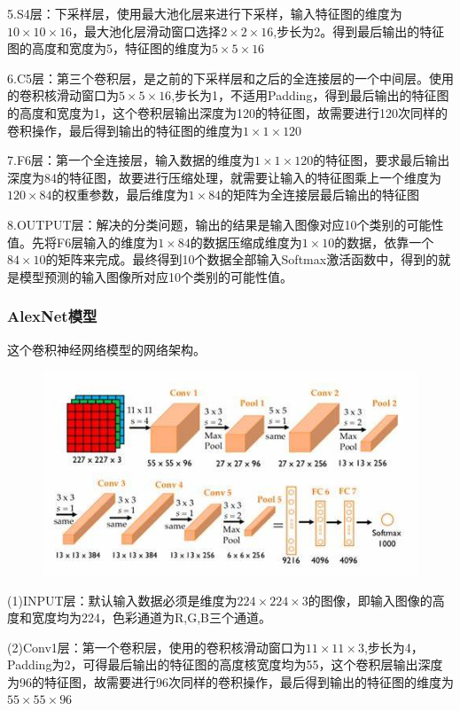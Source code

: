 \documentclass[openbib]{article}
\begin{document}
5.S4层：下采样层，使用最大池化层来进行下采样，输入特征图的维度为$10\times10\times16$，最大池化层滑动窗口选择$2\times2\times16$,步长为2。得到最后输出的特征图的高度和宽度为5，特征图的维度为$5\times5\times16$

6.C5层：第三个卷积层，是之前的下采样层和之后的全连接层的一个中间层。使用的卷积核滑动窗口为$5\times5\times16$,步长为1，不适用Padding，得到最后输出的特征图的高度和宽度为1，这个卷积层输出深度为120的特征图，故需要进行120次同样的卷积操作，最后得到输出的特征图的维度为$1\times1\times120$

7.F6层：第一个全连接层，输入数据的维度为$1\times1\times120$的特征图，要求最后输出深度为84的特征图，故要进行压缩处理，就需要让输入的特征图乘上一个维度为$120\times84$的权重参数，最后维度为$1\times84$的矩阵为全连接层最后输出的特征图

8.OUTPUT层：解决的分类问题，输出的结果是输入图像对应10个类别的可能性值。先将F6层输入的维度为$1\times84$的数据压缩成维度为$1\times10$的数据，依靠一个$84\times10$的矩阵来完成。最终得到10个数据全部输入Softmax激活函数中，得到的就是模型预测的输入图像所对应10个类别的可能性值。
\subsubsection{AlexNet模型}
这个卷积神经网络模型的网络架构。
\begin{figure}[htbp]
	\centering
	\includegraphics[scale=0.5]{AlexNet}
\end{figure}

(1)INPUT层：默认输入数据必须是维度为$224\times224\times3$的图像，即输入图像的高度和宽度均为224，色彩通道为R,G,B三个通道。

(2)Conv1层：第一个卷积层，使用的卷积核滑动窗口为$11\times11\times3$,步长为4，Padding为2，可得最后输出的特征图的高度核宽度均为55，这个卷积层输出深度为96的特征图，故需要进行96次同样的卷积操作，最后得到输出的特征图的维度为$55\times55\times96$
\end{document}
